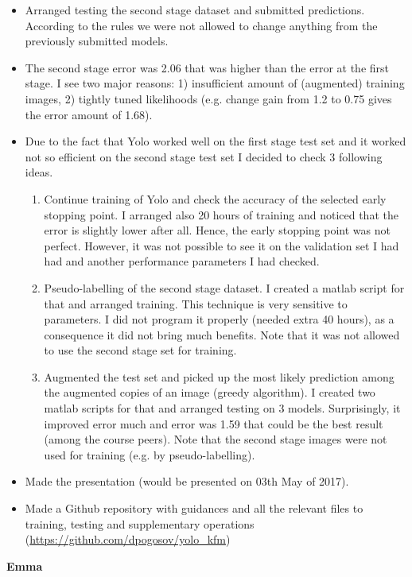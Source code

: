 \documentclass[a4paper]{article}
\begin{document}
\begin{itemize}
	\item Arranged testing the second stage dataset and submitted predictions. According to the rules we were not allowed to change anything from the previously submitted models.
	
	\item The second stage error was 2.06 that was higher than the error at the first stage. I see two major reasons: 1) insufficient amount of (augmented) training images, 2) tightly tuned likelihoods (e.g. change gain from 1.2 to 0.75 gives the error amount of 1.68). 
	
	\item Due to the fact that Yolo worked well on the first stage test set and it worked not so efficient on the second stage test set I decided to check 3 following ideas.
	\begin{enumerate}
		\item Continue training of Yolo and check the accuracy of the selected early stopping point. I arranged also 20 hours of training and noticed that the error is slightly lower after all. Hence, the early stopping point was not perfect. However, it was not possible to see it on the validation set I had had and another performance parameters I had checked.
		\item Pseudo-labelling of the second stage dataset. I created a matlab script for that and arranged training. This technique is very sensitive to parameters. I did not program it properly (needed extra 40 hours), as a consequence it did not bring much benefits. Note that it was not allowed to use the second stage set for training.
		\item 	Augmented the test set and picked up the most likely prediction among the augmented copies of an image (greedy algorithm). I created two matlab scripts for that and arranged testing on 3 models. Surprisingly, it improved error much and error was 1.59 that could be the best result (among the course peers). Note that the second stage images were not used for training (e.g. by pseudo-labelling). 	
	\end{enumerate}
	\item Made the presentation (would be presented on 03th May of 2017).
	\item Made a Github repository with guidances and all the relevant files to training, testing and  supplementary operations (\url{https://github.com/dpogosov/yolo_kfm})
\end{itemize}

\textbf{Emma}\\
\end{document}
